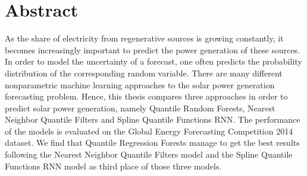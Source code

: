 
\chapter*{Abstract}

\begin{center}
  \begin{minipage}{12cm}
    \begin{sloppypar}
      As the share of electricity from regenerative sources is growing constantly, 
      it becomes increasingly important to predict the power generation of these sources. 
      In order to model the uncertainty of a forecast, one often predicts the probability 
      distribution of the corresponding random variable. There are many different nonparametric machine learning approaches 
      to the solar power generation forecasting problem. Hence, this thesis compares three approaches 
      in order to predict solar power generation, namely Quantile Random Forests, Nearest Neighbor Quantile Filters and 
      Spline Quantile Functions RNN. The performance of the models is evaluated on the Global Energy Forecasting Competition 2014 
      dataset. 
      We find that Quantile Regression Forests manage to get the best results following 
      the Nearest Neighbor Quantile Filters model and the Spline Quantile Functions RNN model as third place of those three models. 
    \end{sloppypar}
  \end{minipage}
\end{center}